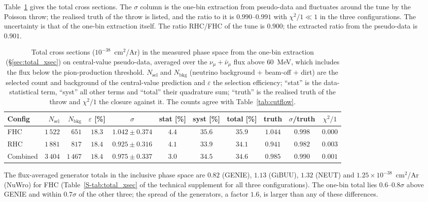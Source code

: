 \documentclass[11pt,a4paper]{article}
\newcommand{\suppref}[2]{#1~\ref{S-#2} of the technical supplement}
\begin{document}
Table~\ref{tab:cutcount} gives the total cross sections. The $\sigma$ column is the one-bin extraction from pseudo-data and fluctuates
around the tune by the Poisson throw; the realised truth of the throw is listed, and the ratio to it
is $0.990$--$0.991$ with $\chi^2/1\ll1$ in the three configurations. The uncertainty is that of the
one-bin extraction itself. The ratio RHC/FHC of the tune is $0.900$; the extracted ratio from the
pseudo-data is $0.901$.

\begin{table}[H]
  \centering
  \caption{Total cross sections ($10^{-38}$~cm$^2$/Ar) in the measured phase space from the one-bin
    extraction (\S\ref{sec:total_xsec}) on central-value pseudo-data, averaged over the
    $\nu_\mu+\bar\nu_\mu$ flux above $60$~MeV, which includes the flux below the pion-production
    threshold. $N_\mathrm{sel}$ and $N_\mathrm{bkg}$ (neutrino background $+$ beam-off $+$ dirt) are the
    selected count and background of the central-value prediction and $\varepsilon$ the selection
    efficiency; ``stat'' is the data-statistical term, ``syst'' all other terms and ``total'' their
    quadrature sum; ``truth'' is the realised truth of the throw and $\chi^2/1$ the closure against it.
    The counts agree with Table~\ref{tab:cutflow}.}
  \label{tab:cutcount}
  \footnotesize
  \begin{tabular}{lrrcccccccc}
\toprule
Config & $N_\mathrm{sel}$ & $N_\mathrm{bkg}$ & $\varepsilon$ [\%] & $\sigma$ & stat [\%] & syst [\%] & total [\%] & truth & $\sigma$/truth & $\chi^2/1$ \\
\midrule
    FHC      & $1\,522$ & $651$ & $18.3$ & $1.042\pm0.374$ & $4.4$ & $35.6$ & $35.9$ & $1.044$ & $0.998$ & $0.000$ \\
    RHC      & $1\,881$ & $817$ & $18.4$ & $0.925\pm0.316$ & $4.1$ & $33.9$ & $34.1$ & $0.941$ & $0.982$ & $0.003$ \\
    Combined & $3\,404$ & $1\,467$ & $18.4$ & $0.975\pm0.337$ & $3.0$ & $34.5$ & $34.6$ & $0.985$ & $0.990$ & $0.001$ \\
\bottomrule
\end{tabular}
\end{table}

The flux-averaged generator totals in the inclusive phase space are $0.82$ (GENIE), $1.13$ (GiBUU),
$1.32$ (NEUT) and $1.25\times10^{-38}$~cm$^2$/Ar (NuWro) for FHC (\suppref{Table}{tab:total_xsec}
for all three configurations). The one-bin total lies $0.6$--$0.8\sigma$ above GENIE and within
$0.7\sigma$ of the other three; the spread of the generators, a factor $1.6$, is larger than any of
these differences.
\end{document}
